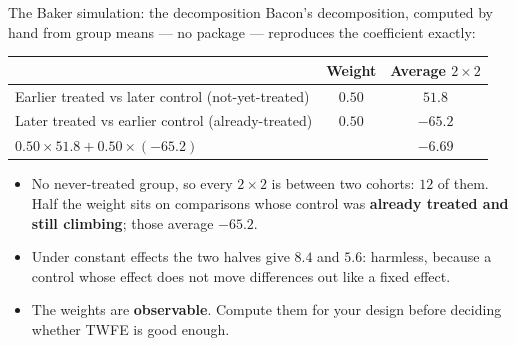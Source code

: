 \documentclass[
  11pt,
  ignorenonframetext,
  aspectratio=169,
]{beamer}
\providecommand{\tightlist}{%
  \setlength{\itemsep}{0pt}\setlength{\parskip}{0pt}}
\begin{document}
\begin{frame}{The Baker simulation: the decomposition}
\protect{}\label{the-baker-simulation-the-decomposition}
Bacon's decomposition, computed by hand from group means --- no package
--- reproduces the coefficient exactly:

\begin{center}\small
\begin{tabular}{lcc}
\toprule
 & Weight & Average $2 \times 2$ \\
\midrule
Earlier treated vs later control (not-yet-treated) & $0.50$ & $51.8$ \\
Later treated vs earlier control (already-treated) & $0.50$ & $-65.2$ \\
\midrule
$0.50 \times 51.8 + 0.50 \times (-65.2)$ & & $-6.69$ \\
\bottomrule
\end{tabular}
\end{center}

\begin{itemize}
\tightlist
\item
  No never-treated group, so every \(2 \times 2\) is between two
  cohorts: \(12\) of them. Half the weight sits on comparisons whose
  control was \textbf{already treated and still climbing}; those average
  \(-65.2\).
\item
  Under constant effects the two halves give \(8.4\) and \(5.6\):
  harmless, because a control whose effect does not move differences out
  like a fixed effect.
\item
  The weights are \textbf{observable}. Compute them for your design
  before deciding whether TWFE is good enough.
\end{itemize}
\end{frame}
\end{document}
